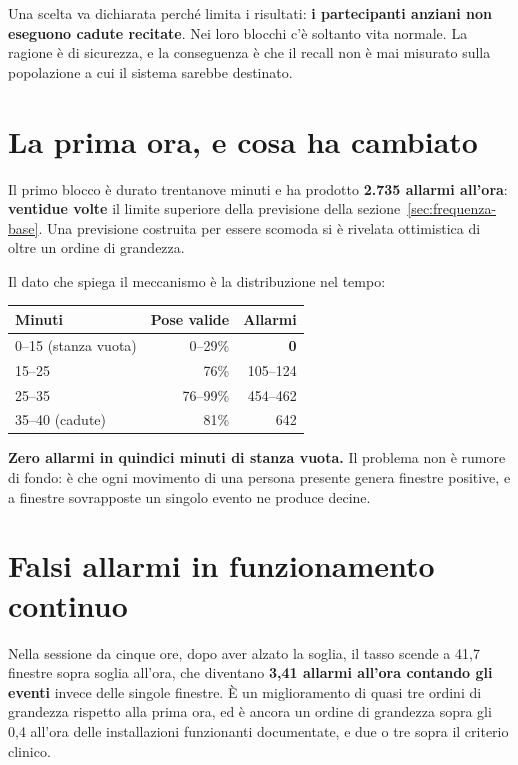 Una scelta va dichiarata perché limita i risultati: \textbf{i partecipanti anziani non eseguono cadute recitate}. Nei loro blocchi c'è soltanto vita normale. La ragione è di sicurezza, e la conseguenza è che il recall non è mai misurato sulla popolazione a cui il sistema sarebbe destinato.

\section{La prima ora, e cosa ha cambiato}
\label{sec:prima-ora}

Il primo blocco è durato trentanove minuti e ha prodotto \textbf{2.735 allarmi all'ora}: \textbf{ventidue volte} il limite superiore della previsione della sezione~\ref{sec:frequenza-base}. Una previsione costruita per essere scomoda si è rivelata ottimistica di oltre un ordine di grandezza.

Il dato che spiega il meccanismo è la distribuzione nel tempo:

\begin{center}
\begin{tabular}{lrr}
\toprule
Minuti & Pose valide & Allarmi \\
\midrule
0--15 (stanza vuota) & 0--29\% & \textbf{0} \\
15--25 & 76\% & 105--124 \\
25--35 & 76--99\% & 454--462 \\
35--40 (cadute) & 81\% & 642 \\
\bottomrule
\end{tabular}
\end{center}

\textbf{Zero allarmi in quindici minuti di stanza vuota.} Il problema non è rumore di fondo: è che ogni movimento di una persona presente genera finestre positive, e a finestre sovrapposte un singolo evento ne produce decine.

\section{Falsi allarmi in funzionamento continuo}
\label{sec:falsi-allarmi}
\label{sec:finestre-eventi}

Nella sessione da cinque ore, dopo aver alzato la soglia, il tasso scende a 41,7 finestre sopra soglia all'ora, che diventano \textbf{3,41 allarmi all'ora contando gli eventi} invece delle singole finestre. È un miglioramento di quasi tre ordini di grandezza rispetto alla prima ora, ed è ancora un ordine di grandezza sopra gli 0,4 all'ora delle installazioni funzionanti documentate, e due o tre sopra il criterio clinico.

